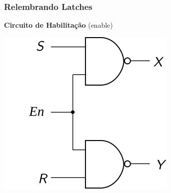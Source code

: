\documentclass{beamer}
\begin{document}
\begin{frame}
\frametitle{Relembrando Latches}

\textbf{Circuito de Habilitação} (enable)

\begin{center}
\includegraphics{images/enable_circuit}
\end{center}

\end{frame}
\end{document}
